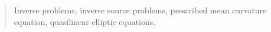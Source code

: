 \documentclass[a4paper, 10pt, twoside, notitlepage]{amsart}
\theoremstyle{plain}
\numberwithin{equation}{section}
\begin{document}
\begin{abstract}






	 
		\medskip
		
		 Inverse problems, inverse source problems, prescribed mean curvature equation, quasilinear elliptic equations.
		
		
	\end{abstract}
	
	
    \tableofcontents
	
	
	
	
\end{document}
